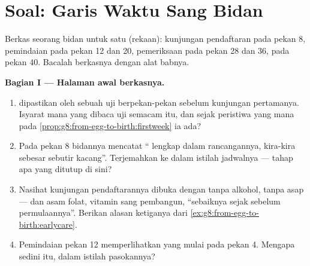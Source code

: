 \section{Soal: Garis Waktu Sang Bidan}

\begin{problem}\label{pb:g8:from-egg-to-birth:1}
Berkas seorang bidan untuk satu  (rekaan):
kunjungan pendaftaran pada pekan 8, pemindaian pada pekan 12
dan 20, pemeriksaan pada pekan 28 dan 36,  pada
pekan 40. Bacalah berkasnya dengan alat babnya.

\medskip\noindent\textbf{Bagian I --- Halaman awal
berkasnya.}
\begin{enumerate}
  \item {} dipastikan oleh sebuah uji 
        berpekan-pekan sebelum kunjungan pertamanya. Isyarat
        mana yang dibaca uji semacam itu, dan sejak
        peristiwa yang mana pada
        \cref{prop:g8:from-egg-to-birth:firstweek} ia ada?
  \item Pada pekan 8 bidannya mencatat `` lengkap
        dalam rancangannya, kira-kira sebesar sebutir
        kacang''. Terjemahkan ke dalam istilah jadwalnya ---
        tahap apa yang ditutup di sini?
  \item Nasihat kunjungan pendaftarannya dibuka dengan tanpa
        alkohol, tanpa asap --- dan asam folat, vitamin sang
        pembangun, ``sebaiknya sejak sebelum permulaannya''.
        Berikan alasan ketiganya dari
        \cref{ex:g8:from-egg-to-birth:earlycare}.
  \item Pemindaian pekan 12 memperlihatkan 
        yang mulai pada pekan 4. Mengapa sedini itu, dalam
        istilah pasokannya?
\end{enumerate}


\end{problem}
